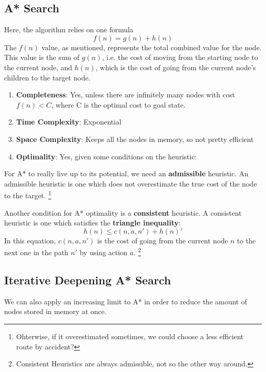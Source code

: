 \documentclass{tufte-handout}
\begin{document}
\subsection{A* Search}
Here, the algorithm relies on one formula
\begin{equation}
	f(n) = g(n) + h(n)
\end{equation}
The $f(n)$ value, as mentioned, represents the total combined value for the node.
This value is the sum of $g(n)$, i.e. the cost of moving from the starting node to the current node,
	and $h(n)$, which is the cost of going from the current node's children to the target node.
\begin{enumerate}
	\item \textbf{Completeness}: Yes, unless there are infinitely many nodes with cost $f(n)<C$, where C is the 
		optimal cost to goal state.
	\item \textbf{Time Complexity}: Exponential
	\item \textbf{Space Complexity}: Keeps all the nodes in memory, so not pretty efficient
	\item \textbf{Optimality}: Yes, given some conditions on the heuristic:
\end{enumerate}
For A* to really live up to its potential, we need an \textbf{admissible} heuristic. 
An admissible heuristic is one which does not overestimate the true cost of the node to the target.
\footnote{Ohterwise, if it overestimated sometimes, we could choose a less efficient route by accident?}

Another condition for A* optimality is a \textbf{consistent} heuristic. A consistent heuristic is one which
satisfies the \textbf{triangle inequality}:
\begin{equation}
	 h(n) \leq c(n,a,n') + h(n)'
\end{equation}
In this equation, $c(n,a,n')$ is the cost of going from the current node $n$ 
	to the next one in the path $n'$ by using action $a$.
\footnote{Consistent Heuristics are always admissible, not so the other way around.}

\subsection{Iterative Deepening A* Search}
We can also apply an increasing limit to A* in order to reduce the amount of nodes stored in memory at once.
\end{document}
